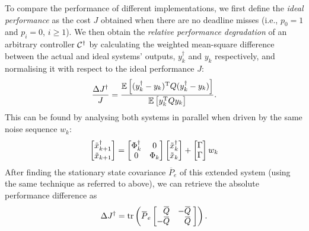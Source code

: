 To compare the performance of different implementations, we first define the \emph{ideal performance} as the cost $J$ obtained when there are no deadline misses (i.e., $p_0 = 1$ and $p_i = 0$, $i \geq 1$).
We then obtain the \emph{relative performance degradation} of an arbitrary controller $\mathcal{C}^{\dagger}$ by calculating the weighted mean-square difference between the actual and ideal systems' outputs, $y^{\dagger}_k$ and $y_k$ respectively, and normalising it with respect to the ideal performance $J$:
\begin{equation}
    \label{eq:relcost}
    \frac{\Delta J^{\dagger}}{J} = \frac{\E{ (y^{\dagger}_k - y_k)^{\T} Q (y^{\dagger}_k - y_k) }}{ \E{ y_k^{\T} Q y_k }}.
\end{equation}
This can be found by analysing both systems in parallel when driven by the same noise sequence $w_k$:
\begin{equation*}
    \begin{bmatrix}
        \tilde{x}_{k+1}^\dagger \\ \tilde{x}_{k+1}%
    \end{bmatrix} =
    \begin{bmatrix}
        \clmat{}_k^\dagger & 0 \\ 0 & \clmat{}_k%
    \end{bmatrix}
    \begin{bmatrix}
        \tilde{x}_k^\dagger \\ \tilde{x}_k%
    \end{bmatrix} +
    \begin{bmatrix}
        \clinp{} \\ \clinp{}
    \end{bmatrix} w_k
\end{equation*}
After finding the stationary state covariance $\overbar{P}_e$ of this extended system (using the same technique as referred to above), we can retrieve the absolute performance difference as
\begin{equation*}
    \label{eq:deltaJ}
    \Delta J^{\dagger} = \trace{ \overbar{P}_e  \begin{bmatrix}
        \phantom{-}\overbar{Q} & -\overbar{Q}\phantom{,} \\
        -\overbar{Q} & \phantom{-}\overbar{Q}\phantom{,}
    \end{bmatrix} }.
\end{equation*}

